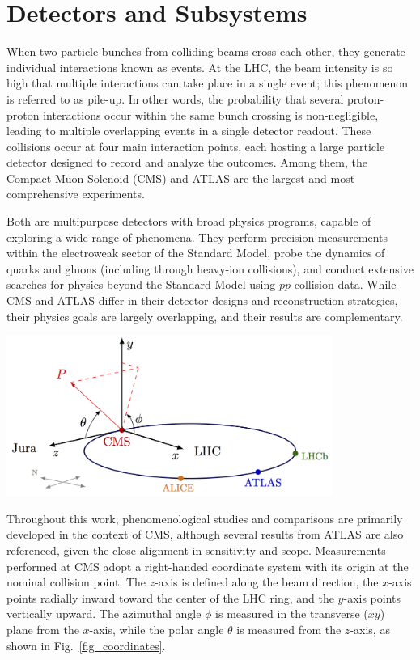 \section{Detectors and Subsystems}\label{sec:detectors}

When two particle bunches from colliding beams cross each other, they generate individual interactions known as events. At the LHC, the beam intensity is so high that multiple interactions can take place in a single event; this phenomenon is referred to as pile-up. In other words, the probability that several proton-proton interactions occur within the same bunch crossing is non-negligible, leading to multiple overlapping events in a single detector readout. These collisions occur at four main interaction points, each hosting a large particle detector designed to record and analyze the outcomes. Among them, the Compact Muon Solenoid (CMS) and ATLAS are the largest and most comprehensive experiments.

Both are multipurpose detectors with broad physics programs, capable of exploring a wide range of phenomena. They perform precision measurements within the electroweak sector of the Standard Model, probe the dynamics of quarks and gluons (including through heavy-ion collisions), and conduct extensive searches for physics beyond the Standard Model using $pp$ collision data. While CMS and ATLAS differ in their detector designs and reconstruction strategies, their physics goals are largely overlapping, and their results are complementary.

\begin{center}
    \includegraphics[width=0.8\textwidth]{Images/coordinatechart.png}
    \label{fig_coordinates}
\end{center}

Throughout this work, phenomenological studies and comparisons are primarily developed in the context of CMS, although several results from ATLAS are also referenced, given the close alignment in sensitivity and scope. Measurements performed at CMS adopt a right-handed coordinate system with its origin at the nominal collision point. The $z$-axis is defined along the beam direction, the $x$-axis points radially inward toward the center of the LHC ring, and the $y$-axis points vertically upward. The azimuthal angle $\phi$ is measured in the transverse ($xy$) plane from the $x$-axis, while the polar angle $\theta$ is measured from the $z$-axis, as shown in Fig.~\ref{fig_coordinates}.



